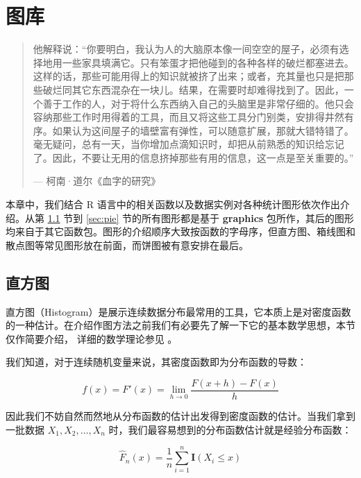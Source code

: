 \documentclass[
  b5paper,
  UTF8,twoside]{book}
\begin{document}
\chapter{图库}\label{cha:gallery}

\begin{quote}
他解释说：``你要明白，我认为人的大脑原本像一间空空的屋子，必须有选择地用一些家具填满它。只有笨蛋才把他碰到的各种各样的破烂都塞进去。这样的话，那些可能用得上的知识就被挤了出来；或者，充其量也只是把那些破烂同其它东西混杂在一块儿。结果，在需要时却难得找到了。因此，一个善于工作的人，对于将什么东西纳入自己的头脑里是非常仔细的。他只会容纳那些工作时用得着的工具，而且又将这些工具分门别类，安排得井然有序。如果认为这间屋子的墙壁富有弹性，可以随意扩展，那就大错特错了。毫无疑问，总有一天，当你增加点滴知识时，却把从前熟悉的知识给忘记了。因此，不要让无用的信息挤掉那些有用的信息，这一点是至关重要的。''

\hspace*{\fill} --- 柯南·道尔《血字的研究》
\end{quote}

本章中，我们结合 R 语言中的相关函数以及数据实例对各种统计图形依次作出介绍。从第 \ref{sec:hist} 节到 \ref{sec:pie} 节的所有图形都是基于 \textbf{graphics} 包所作，其后的图形均来自于其它函数包。图形的介绍顺序大致按函数的字母序，但直方图、箱线图和散点图等常见图形放在前面，而饼图被有意安排在最后。

\section{直方图}\label{sec:hist}

直方图（Histogram）是展示连续数据分布最常用的工具，它本质上是对密度函数的一种估计。在介绍作图方法之前我们有必要先了解一下它的基本数学思想，本节仅作简要介绍，
详细的数学理论参见 \citet{Scott92}。

我们知道，对于连续随机变量来说，其密度函数即为分布函数的导数：

\begin{equation} 
f(x)=F'(x)=\lim_{h\rightarrow0}\frac{F(x+h)-F(x)}{h}
\label{eq:density}
\end{equation}

因此我们不妨自然而然地从分布函数的估计出发得到密度函数的估计。当我们拿到一批数据 \(X_1,X_2,\ldots,X_n\) 时，我们最容易想到的分布函数估计就是经验分布函数：

\begin{equation} 
\hat{F}_{n}(x)=\frac{1}{n}\sum_{i=1}^{n}\mathbf{I}(X_{i}\leq x)
\label{eq:empirical}
\end{equation}
\end{document}
